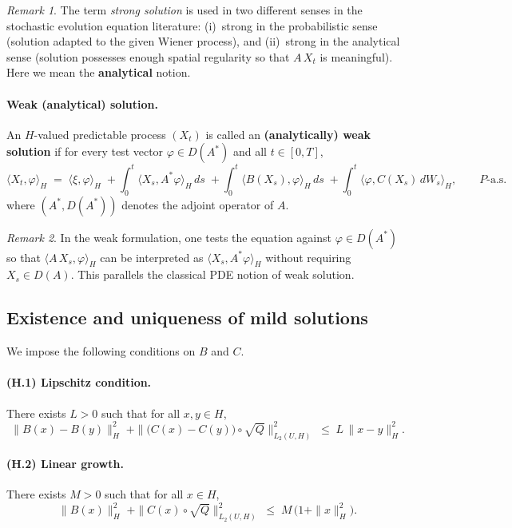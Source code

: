 \documentclass[11pt]{article}
\theoremstyle{definition}
\theoremstyle{remark}
\newtheorem{remark}{Remark}
\begin{document}
\begin{remark}
The term \emph{strong solution} is used in two different senses in the
stochastic evolution equation literature: (i)\ strong in the
probabilistic sense (solution adapted to the given Wiener process), and
(ii)\ strong in the analytical sense (solution
possesses enough spatial regularity so that $A\,X_t$ is meaningful).
Here we mean the \textbf{analytical} notion.
\end{remark}

\paragraph{Weak (analytical) solution.}
An $H$-valued predictable process $(X_t)$ is called an
\textbf{(analytically) weak solution} if for every test vector
$\varphi \in D(A^*)$ and all $t\in[0,T]$,
\[
    \langle X_t,\varphi\rangle_H
    \;=\;
    \langle \xi,\varphi\rangle_H
    \;+
    \int_0^t \langle X_s, A^*\varphi\rangle_H\,ds
    \;+
    \int_0^t \langle B(X_s),\varphi\rangle_H\,ds
    \;+
    \int_0^t \langle \varphi, C(X_s)\,dW_s\rangle_H,
    \qquad P\text{-a.s.}
\]
where $(A^*,D(A^*))$ denotes the adjoint operator of $A$.

\begin{remark}
In the weak formulation, one tests the equation against $\varphi \in D(A^*)$
so that $\langle A\,X_s,\varphi\rangle_H$ can be interpreted as
$\langle X_s, A^*\varphi\rangle_H$ without requiring $X_s\in D(A)$.
This parallels the classical PDE notion of weak solution.
\end{remark}

\subsection*{Existence and uniqueness of mild solutions}

We impose the following conditions on $B$ and $C$.

\paragraph{(H.1) Lipschitz condition.}
There exists $L>0$ such that for all $x,y\in H$,
\[
    \|B(x)-B(y)\|_H^2
    \;+
    \|\bigl(C(x)-C(y)\bigr)\circ\sqrt{Q}\|_{L_2(U,H)}^2
    \;\le\;
    L\,\|x-y\|_H^2.
\]

\paragraph{(H.2) Linear growth.}
There exists $M>0$ such that for all $x\in H$,
\[
    \|B(x)\|_H^2
    \;+
    \|C(x)\circ\sqrt{Q}\|_{L_2(U,H)}^2
    \;\le\;
    M\,\bigl(1+\|x\|_H^2\bigr).
\]
\end{document}
